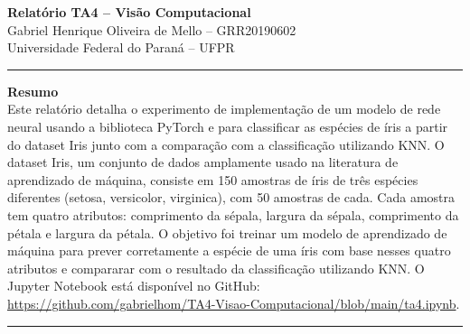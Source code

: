 \documentclass[a4paper,12pt]{article}
\renewenvironment{abstract}
 {\par\noindent\textbf{\abstractname}\ \ignorespaces \\}
 {\par\noindent\medskip}
\renewcommand{\abstractname}{Resumo}
\begin{document}
\pagestyle{fancy}
\thispagestyle{empty}
\fancyhead[L]{}
\renewcommand*{\thefootnote}{\fnsymbol{footnote}}
\begin{center}
\Large{\textbf{Relatório TA4 -- Visão Computacional}}
\vspace{0.4cm}
\normalsize
\\ Gabriel Henrique Oliveira de Mello -- GRR20190602 \\
\vspace{0.1cm}
\small{Universidade Federal do Paraná -- UFPR}
\medskip
\normalsize
\end{center}
{\color{gray}\hrule}
\vspace{0.4cm}
\begin{abstract}
Este relatório detalha o experimento de implementação de um modelo de rede neural usando a biblioteca PyTorch e para classificar as espécies de íris a partir do dataset Iris junto com a comparação com a classificação utilizando KNN.
O dataset Iris, um conjunto de dados amplamente usado na literatura de aprendizado de máquina, consiste em 150 amostras de íris de três espécies diferentes (setosa, versicolor, virginica), com 50 amostras de cada.
Cada amostra tem quatro atributos: comprimento da sépala, largura da sépala, comprimento da pétala e largura da pétala.
O objetivo foi treinar um modelo de aprendizado de máquina para prever corretamente a espécie de uma íris com base nesses quatro atributos e compararar com o resultado da classificação utilizando KNN.
O Jupyter Notebook está disponível no GitHub: \url{https://github.com/gabrielhom/TA4-Visao-Computacional/blob/main/ta4.ipynb}.
\end{abstract}
{\color{gray}\hrule}
\medskip






\end{document}
